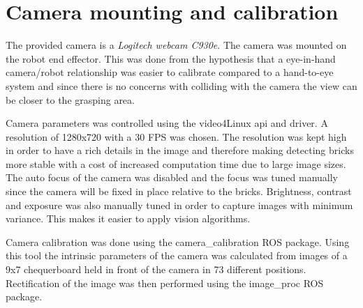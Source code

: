 \section{Camera mounting and calibration}
\label{sec:rc_camera}
The provided camera is a \textit{Logitech webcam C930e}. The camera was mounted on the robot end effector. This was done from the hypothesis that a eye-in-hand camera/robot relationship was easier to calibrate compared to a hand-to-eye system and since there is no concerns with colliding with the camera the view can be closer to the grasping area.

Camera parameters was controlled using the video4Linux api and driver. A resolution of 1280x720 with a 30 FPS was chosen. The resolution was kept high in order to have a rich details in the image and therefore making detecting bricks more stable with a cost of increased computation time due to large image sizes. 
The auto focus of the camera was disabled and the focus was tuned manually since the camera will be fixed in place relative to the bricks.
Brightness, contrast and exposure was also manually tuned in order to capture images with minimum variance. This makes it easier to apply vision algorithms.

Camera calibration was done using the camera\_calibration ROS package. Using this tool the intrinsic parameters of the camera was calculated from images of a 9x7 chequerboard held in front of the camera in 73 different positions. Rectification of the image was then performed using the image\_proc ROS package.
